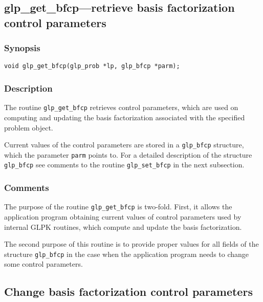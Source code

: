 
\newpage

\subsection{glp\_get\_bfcp---retrieve basis factorization control
parameters}

\subsubsection*{Synopsis}

\begin{verbatim}
void glp_get_bfcp(glp_prob *lp, glp_bfcp *parm);
\end{verbatim}

\subsubsection*{Description}

The routine \verb|glp_get_bfcp| retrieves control parameters, which are
used on computing and updating the basis factorization associated with
the specified problem object.

Current values of the control parameters are stored in a \verb|glp_bfcp|
structure, which the parameter \verb|parm| points to. For a detailed
description of the structure \verb|glp_bfcp| see comments to the routine
\verb|glp_set_bfcp| in the next subsection.

\subsubsection*{Comments}

The purpose of the routine \verb|glp_get_bfcp| is two-fold. First, it
allows the application program obtaining current values of control
parameters used by internal GLPK routines, which compute and update the
basis factorization.

The second purpose of this routine is to provide proper values for all
fields of the structure \verb|glp_bfcp| in the case when the application
program needs to change some control parameters.

\subsection{Change basis factorization control parameters}

